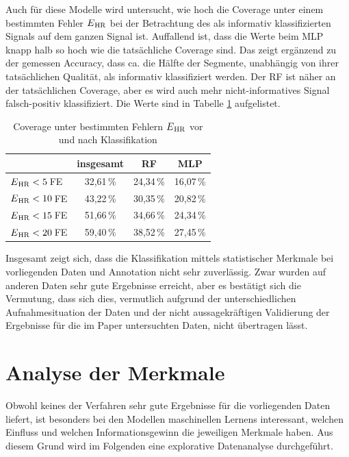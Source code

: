  Auch für diese Modelle wird untersucht, wie hoch die Coverage unter einem bestimmten Fehler $E\textsubscript{HR}$ bei der Betrachtung des als informativ klassifizierten Signals auf dem ganzen Signal ist. Auffallend ist, dass die Werte beim \ac{MLP} knapp halb so hoch wie die tatsächliche Coverage sind. Das zeigt ergänzend zu der gemessen Accuracy, dass ca. die Hälfte der Segmente, unabhängig von ihrer tatsächlichen Qualität, als informativ klassifiziert werden. Der \ac{RF} ist näher an der tatsächlichen Coverage, aber es wird auch mehr nicht-informatives Signal falsch-positiv klassifiziert. Die Werte sind in Tabelle \ref{fig:ml-statistical-coverage} aufgelistet.
 
  \begin{table}[H]
 	\centering
  	\begin{tabular}{l || c | c | c}
 											& insgesamt 		& RF			& MLP\\\hline
 		$E\textsubscript{HR} < 5$\,\si{FE} 	&  32{,}61\,\% 	& 24,34\,\%	& 16,07\,\%	\\
 		$E\textsubscript{HR} < 10$\,\si{FE} 	&  43{,}22\,\% 	& 30,35\,\% 	& 20,82\,\%	\\
 		$E\textsubscript{HR} < 15$\,\si{FE} 	&  51{,}66\,\% 	& 34,66\,\% 	& 24,34\,\%	\\
 		$E\textsubscript{HR} < 20$\,\si{FE} 	&  59{,}40\,\% 	& 38,52\,\% 	& 27,45\,\%\\
 	\end{tabular}
 	\caption[Coverage unter bestimmten Fehlern $E\textsubscript{HR}$ vor und nach Klassifikation mittels statistischen Merkmalen]{Coverage unter bestimmten Fehlern $E\textsubscript{HR}$ vor und nach Klassifikation}
 	\label{fig:ml-statistical-coverage}
 \end{table}
 
 Insgesamt zeigt sich, dass die Klassifikation mittels statistischer Merkmale bei vorliegenden Daten und Annotation nicht sehr zuverlässig. Zwar wurden auf anderen Daten sehr gute Ergebnisse erreicht, aber es bestätigt sich die Vermutung, dass sich dies, vermutlich aufgrund der unterschiedlichen Aufnahmesituation der Daten und der nicht aussagekräftigen Validierung der Ergebnisse für die im Paper untersuchten Daten, nicht übertragen lässt. 
 
\section{Analyse der Merkmale}

Obwohl keines der Verfahren sehr gute Ergebnisse für die vorliegenden Daten liefert, ist besonders bei den Modellen maschinellen Lernens interessant, welchen Einfluss und welchen Informationsgewinn die jeweiligen Merkmale haben. Aus diesem Grund wird im Folgenden eine explorative Datenanalyse durchgeführt.


